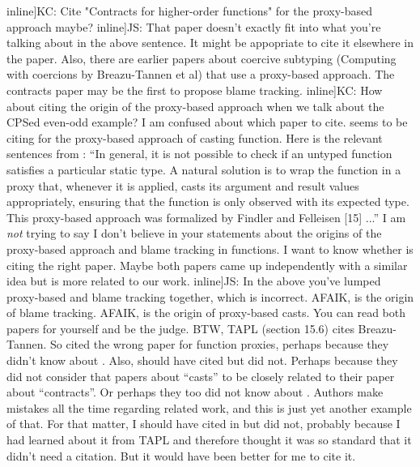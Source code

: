 \documentclass[runningheads]{llncs}
\newcommand{\todo}[1]{}
\begin{document}
\todo[inline]{KC: Cite "Contracts for higher-order functions" for the proxy-based approach maybe?}
\todo[inline]{JS: That paper doesn't exactly fit into what you're talking about in the above
sentence. It might be appopriate to cite it elsewhere in the paper. Also,
there are earlier papers about coercive subtyping (Computing with coercions by Breazu-Tannen et al)
that use a proxy-based approach. The contracts paper may be the first to propose blame tracking.}
\todo[inline]{KC: How about citing the origin of the proxy-based approach when we talk
about the CPSed even-odd example?
I am confused about which paper to cite. \cite{herman2010space} seems to be citing
\cite{findler2002contracts} for the proxy-based approach of casting function.
Here is the relevant sentences from \cite{herman2010space}:
``In general, it is not possible to check if an untyped function satisfies a
particular static type. A natural solution is to wrap the function in a proxy that, whenever
it is applied, casts its argument and result values appropriately, ensuring that the function
is only observed with its expected type. This proxy-based approach was formalized by Findler
and Felleisen [15] ...''
I am \textit{not} trying to say I don't believe in your statements about the origins of
the proxy-based approach and blame tracking in functions.
I want to know whether \citet{herman2010space} is citing the right paper.
Maybe both papers came up independently with a similar idea but \cite{findler2002contracts}
is more related to our work.
}
\todo[inline]{JS: In the above you've lumped proxy-based and blame
  tracking together, which is incorrect. AFAIK,
  \cite{findler2002contracts} is the origin of blame tracking. AFAIK,
  \citet{Breazu-Tannen:1990vc} is the origin of proxy-based casts.
  You can read both papers for yourself and be the judge.  BTW, TAPL
  (section 15.6) cites Breazu-Tannen.  So \citet{herman2010space}
  cited the wrong paper for function proxies, perhaps because they
  didn't know about \citet{Breazu-Tannen:1990vc}. Also,
  \cite{findler2002contracts} should have cited
  \citet{Breazu-Tannen:1990vc} but did not. Perhaps because they did
  not consider that papers about ``casts'' to be closely related to
  their paper about ``contracts''.  Or perhaps they too did not know
  about \citet{Breazu-Tannen:1990vc}.  Authors make mistakes all the
  time regarding related work, and this is just yet another example of
  that. For that matter, I should have cited
  \citet{Breazu-Tannen:1990vc} in \citet{siek2006gradual} but did not,
  probably because I had learned about it from TAPL and therefore
  thought it was so standard that it didn't need a citation.  But it
  would have been better for me to cite it.}
\end{document}
